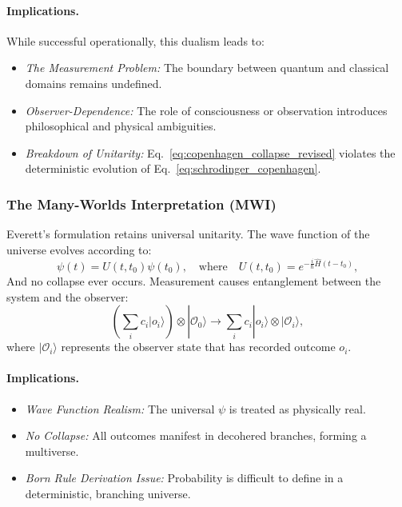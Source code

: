 \documentclass[12pt]{article}
\begin{document}
\paragraph{Implications.} While successful operationally, this dualism leads to:
\begin{itemize}
    \item \emph{The Measurement Problem:} The boundary between quantum and classical domains remains undefined.
    \item \emph{Observer-Dependence:} The role of consciousness or observation introduces philosophical and physical ambiguities.
    \item \emph{Breakdown of Unitarity:} Eq.~\eqref{eq:copenhagen_collapse_revised} violates the deterministic evolution of Eq.~\eqref{eq:schrodinger_copenhagen}.
\end{itemize}

\subsubsection*{The Many-Worlds Interpretation (MWI)}

Everett's formulation retains universal unitarity. The wave function of the universe evolves according to:
\begin{equation}
\psi(t) = U(t, t_0) \psi(t_0), \quad \text{where} \quad U(t, t_0) = e^{-\frac{i}{\hbar} \hat{H}(t - t_0)}, \label{eq:unitary_mwi}
\end{equation}
And no collapse ever occurs. Measurement causes entanglement between the system and the observer:
\begin{equation}
\left( \sum_i c_i |o_i\rangle \right) \otimes |\mathcal{O}_0\rangle 
\rightarrow \sum_i c_i |o_i\rangle \otimes |\mathcal{O}_i\rangle, \label{eq:mwi_branching}
\end{equation}
where $|\mathcal{O}_i\rangle$ represents the observer state that has recorded outcome $o_i$.

\paragraph{Implications.}
\begin{itemize}
    \item \emph{Wave Function Realism:} The universal $\psi$ is treated as physically real.
    \item \emph{No Collapse:} All outcomes manifest in decohered branches, forming a multiverse.
    \item \emph{Born Rule Derivation Issue:} Probability is difficult to define in a deterministic, branching universe.
\end{itemize}
\end{document}
